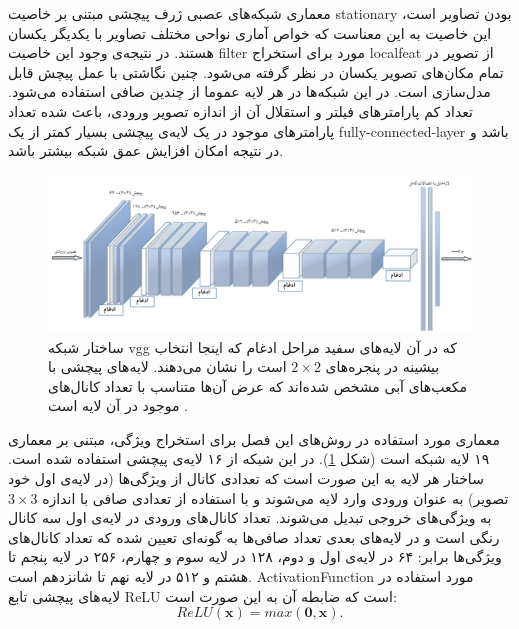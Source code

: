 معماری شبکه‌های عصبی ژرف پیچشی مبتنی بر خاصیت \gls{stationary} بودن تصاویر است، این خاصیت به این معناست که خواص آماری نواحی مختلف تصاویر با یکدیگر یکسان هستند. در نتیجه‌ی وجود این خاصیت \gls{filter} مورد برای استخراج \gls{localfeat} از تصویر در تمام مکان‌های تصویر یکسان در نظر گرفته می‌شود. چنین نگاشتی با عمل پیچش قابل مدل‌سازی است. در این شبکه‌ها در هر لایه عموما از چندین صافی استفاده می‌شود. تعداد کم پارامترهای فیلتر و استقلال آن از اندازه تصویر ورودی، باعث شده تعداد پارامتر‌های موجود در یک لایه‌ی پیچشی بسیار کمتر از یک \gls{fully-connected-layer} باشد و در نتیجه امکان افزایش عمق شبکه بیشتر باشد.
\begin{figure}[!t]
\centering
\includegraphics[width=1.1\linewidth]{images/vgg}
\caption[ساختار شبکه استخراج ویژگی]{
ساختار شبکه vgg که در آن لایه‌های سفید مراحل ادغام که اینجا انتخاب بیشینه در پنجره‌های $2 \times 2$ است را نشان می‌دهند.
لایه‌های پیچشی با مکعب‌های آبی مشخص شده‌اند که عرض آن‌ها متناسب با تعداد کانال‌های موجود در آن لایه است \cite{el2016face}.
}
\label{fig:vgg}
\end{figure}
معماری مورد استفاده در روش‌های این فصل برای استخراج ویژگی، مبتنی بر معماری ۱۹ لایه شبکه  \cite{vgg} است (شکل \ref{fig:vgg}). در این شبکه از ۱۶ لایه‌ی پیچشی استفاده شده است. ساختار هر لایه به این صورت است که تعدادی کانال از ویژگی‌ها (در لایه‌ی اول  خود تصویر) به عنوان ورودی وارد لایه می‌شوند و با استفاده از تعدادی صافی با اندازه $3 \times 3$ به ویژگی‌های خروجی تبدیل می‌شوند. تعداد کانال‌های ورودی در لایه‌ی اول سه کانال رنگی  است و در لایه‌های بعدی تعداد صافی‌ها به گونه‌ای تعیین شده که تعداد کانال‌های ویژگی‌ها برابر: ۶۴ در لایه‌ی اول و دوم، ۱۲۸ در لایه‌ سوم و چهارم، ۲۵۶ در لایه پنجم تا هشتم و ۵۱۲ در لایه نهم تا شانزدهم است. \gls{ActivationFunction} مورد استفاده در لایه‌های پیچشی تابع \gls{ReLU} است که ضابطه آن به این صورت است:
\begin{equation}
ReLU(\mathbf{x}) = max(\mathbf{0,x}).
\end{equation}
